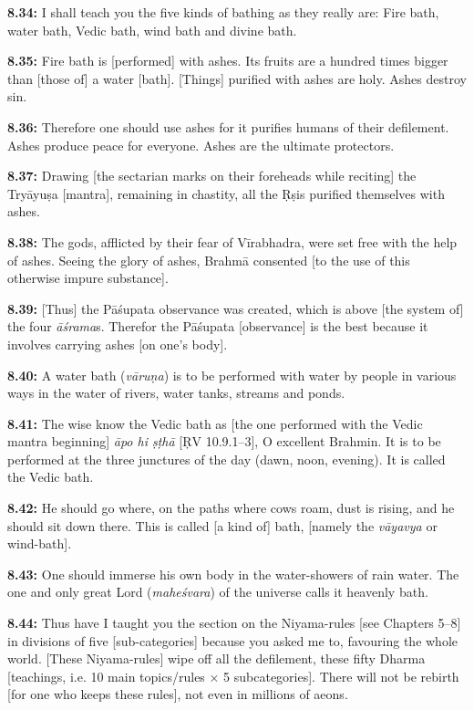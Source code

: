 \documentclass{article}
\newcommand{\vsnum}[1]{\textbf{#1}}
\newcommand{\skt}[1]{\textit{#1}}
\begin{document}
\vsnum{8.34: }I shall teach you the five kinds of bathing as they really are: Fire bath, water bath, Vedic bath, wind bath and divine bath.

\vsnum{8.35: }Fire bath is [performed] with ashes. Its fruits are a hundred times bigger than [those of] a water [bath]. [Things] purified with ashes are holy. Ashes destroy sin.

\vsnum{8.36: }Therefore one should use ashes for it purifies humans of their defilement. Ashes produce peace for everyone. Ashes are the ultimate protectors.

\vsnum{8.37: }Drawing [the sectarian marks on their foreheads while reciting] the Tryāyuṣa [mantra], remaining in chastity, all the Ṛṣis purified themselves with ashes.

\vsnum{8.38: }The gods, afflicted by their fear of Vīrabhadra, were set free with the help of ashes. Seeing the glory of ashes, Brahmā consented [to the use of this otherwise impure substance].

\vsnum{8.39: }[Thus] the Pāśupata observance was created, which is above [the system of] the four \skt{āśrama}s. Therefor the Pāśupata [observance] is the best because it involves carrying ashes [on one's body].

\vsnum{8.40: }A water bath (\skt{vāruṇa}) is to be performed with water by people in various ways in the water of rivers, water tanks, streams and ponds.

\vsnum{8.41: }The wise know the Vedic bath as [the one performed with the Vedic mantra beginning] \skt{āpo hi ṣṭhā} [ṚV 10.9.1--3], O excellent Brahmin. It is to be performed at the three junctures of the day (dawn, noon, evening). It is called the Vedic bath.

\vsnum{8.42: }He should go where, on the paths where cows roam, dust is rising, and he should sit down there. This is called [a kind of] bath, [namely the \skt{vāyavya} or wind-bath].

\vsnum{8.43: }One should immerse his own body in the water-showers of rain water. The one and only great Lord (\skt{maheśvara}) of the universe calls it heavenly bath.

\vsnum{8.44: }Thus have I taught you the section on the Niyama-rules [see Chapters 5--8] in divisions of five [sub-categories] because you asked me to, favouring the whole world. [These Niyama-rules] wipe off all the defilement, these fifty Dharma [teachings, i.e. 10 main topics/rules × 5 subcategories]. There will not be rebirth [for one who keeps these rules], not even in millions of aeons.
\end{document}
